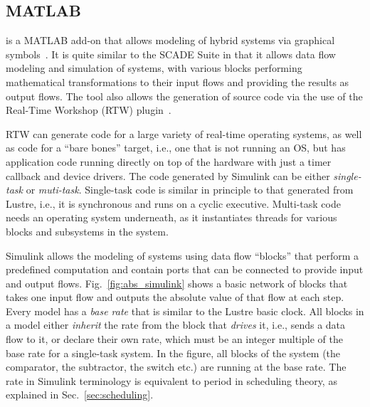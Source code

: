 \subsection{MATLAB \simu}
\simu is a MATLAB add-on that allows modeling of hybrid systems via
graphical symbols~\cite{simulink}. It is quite similar to the SCADE
Suite in that it allows data flow modeling and simulation of systems,
with various blocks performing mathematical transformations to their
input flows and providing the results as output flows. The tool also
allows the generation of source code via the use of the Real-Time
Workshop (RTW) plugin~\cite{rtw}.

RTW can generate code for a large variety of real-time operating
systems, as well as code for a ``bare bones'' target, i.e., one that
is not running an OS, but has application code running directly on top
of the hardware with just a timer callback and device drivers. The
code generated by Simulink can be either \emph{single-task} or
\emph{muti-task}. Single-task code is similar in principle to that
generated from Lustre, i.e., it is synchronous and runs on a cyclic
executive. Multi-task code needs an operating system underneath, as it
instantiates threads for various blocks and subsystems in the system.

Simulink allows the modeling of systems using data flow ``blocks''
that perform a predefined computation and contain ports that can be
connected to provide input and output
flows. Fig.~\ref{fig:abs_simulink} shows a basic network of blocks
that takes one input flow and outputs the absolute value of that flow
at each step. Every model has a \emph{base rate} that is similar to
the Lustre basic clock. All blocks in a model either \emph{inherit}
the rate from the block that \emph{drives} it, i.e., sends a data flow
to it, or declare their own rate, which must be an integer multiple of
the base rate for a single-task system. In the figure, all blocks of
the system (the comparator, the subtractor, the switch etc.) are
running at the base rate. The rate in Simulink terminology is
equivalent to period in scheduling theory, as explained in
Sec.~\ref{sec:scheduling}.

